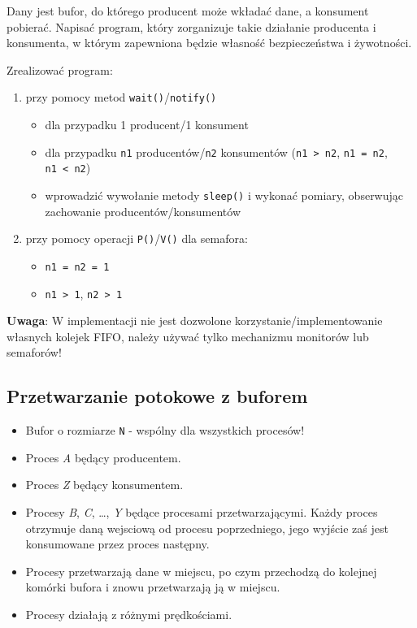 \documentclass[11pt]{article}
\providecommand{\tightlist}{%
      \setlength{\itemsep}{0pt}\setlength{\parskip}{0pt}}
\begin{document}
Dany jest bufor, do którego producent może wkładać dane, a konsument
pobierać. Napisać program, który zorganizuje takie działanie producenta
i konsumenta, w którym zapewniona będzie własność bezpieczeństwa i
żywotności.

Zrealizować program:

\begin{enumerate}
\def\labelenumi{\arabic{enumi}.}
\tightlist
\item
  przy pomocy metod \texttt{wait()}/\texttt{notify()}

  \begin{itemize}
  \tightlist
  \item
    dla przypadku 1 producent/1 konsument
  \item
    dla przypadku \texttt{n1} producentów/\texttt{n2} konsumentów
    (\texttt{n1\ \textgreater{}\ n2}, \texttt{n1\ =\ n2},
    \texttt{n1\ \textless{}\ n2})
  \item
    wprowadzić wywołanie metody \texttt{sleep()} i wykonać pomiary,
    obserwując zachowanie producentów/konsumentów
  \end{itemize}
\item
  przy pomocy operacji \texttt{P()}/\texttt{V()} dla semafora:

  \begin{itemize}
  \tightlist
  \item
    \texttt{n1\ =\ n2\ =\ 1}
  \item
    \texttt{n1\ \textgreater{}\ 1}, \texttt{n2\ \textgreater{}\ 1}
  \end{itemize}
\end{enumerate}

\textbf{Uwaga}: W implementacji nie jest dozwolone
korzystanie/implementowanie własnych kolejek FIFO, należy używać tylko
mechanizmu monitorów lub semaforów!

\hypertarget{przetwarzanie-potokowe-z-buforem}{%
\subsection{Przetwarzanie potokowe z
buforem}\label{przetwarzanie-potokowe-z-buforem}}

\begin{itemize}
\tightlist
\item
  Bufor o rozmiarze \texttt{N} - wspólny dla wszystkich procesów!
\item
  Proces \emph{A} będący producentem.
\item
  Proces \emph{Z} będący konsumentem.
\item
  Procesy \emph{B}, \emph{C}, \ldots, \emph{Y} będące procesami
  przetwarzającymi. Każdy proces otrzymuje daną wejsciową od procesu
  poprzedniego, jego wyjście zaś jest konsumowane przez proces następny.
\item
  Procesy przetwarzają dane w miejscu, po czym przechodzą do kolejnej
  komórki bufora i znowu przetwarzają ją w miejscu.
\item
  Procesy działają z różnymi prędkościami.
\end{itemize}
\end{document}
